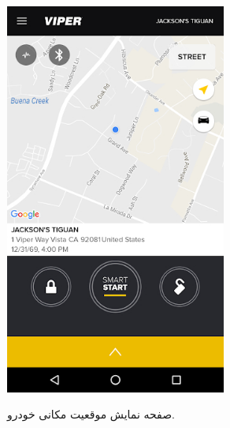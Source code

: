\documentclass[a4paper,12pt]{report}
\begin{document}
\begin{figure}[!h]
\begin{subfigure}[t]{0.3\linewidth}
			\includegraphics[width=0.8\textwidth]{resources/viper_smart_start_1.jpg}
			\label{subfig3:fig1:sec3:chap1}
			\caption{
				صفحه نمایش موقعیت مکانی خودرو.
			}
		\end{subfigure}
		\hspace*{1cm}
		\begin{subfigure}[t]{0.3\linewidth}
			\centering

\end{subfigure}
\end{figure}
\end{document}
